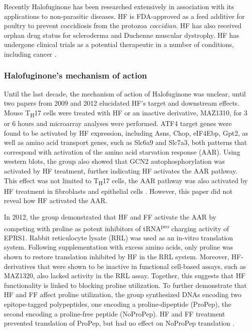 Recently Halofuginone has been researched extensively in association with its applications to non-parasitic diseases.
HF is FDA-approved as a feed additive for poultry to prevent coccidiosis from the protozoa \textit{coccidian}.
HF has also received orphan drug status for scleroderma and Duchenne muscular dystrophy.
HF has undergone clinical trials as a potential therapeutic in a number of conditions, including cancer \cite{halo2012clin, halo2012clin2}.

\subsubsection{Halofuginone's mechanism of action}

Until the last decade, the mechanism of action of Halofuginone was unclear, until two papers from 2009 \cite{sundrud2009halofuginone} and 2012 \cite{keller2012halofuginone} elucidated HF's target and downstream effects.
Mouse T\textsubscript{H}17 cells were treated with HF or an inactive derivative, MAZ1310, for 3 or 6 hours and microarray analyses were performed.
ATF4 target genes were found to be activated by HF expression, including Asns, Chop, eIF4Ebp, Gpt2, as well as amino acid transport genes, such as Slc6a9 and Slc7a3, both patterns that correspond with activation of the amino acid starvation response (AAR).
Using western blots, the group also showed that GCN2 autophosphorylation was activated by HF treatment, further indicating HF activates the AAR pathway.
This effect was not limited to T\textsubscript{H}17 cells, the AAR pathway was also activated by HF treatment in fibroblasts and epithelial cells \cite{sundrud2009halofuginone}.
However, this paper did not reveal how HF activated the AAR.

In 2012, the group demonstrated that HF and FF activate the AAR by competing with proline as potent inhibitors of tRNA\textsuperscript{pro} charging activity of EPRS1.
Rabbit reticulocyte lysate (RRL) was used as an in-vitro translation system.
Following supplementation with excess amino acids, only proline was shown to restore translation inhibited by HF in the RRL system.
Moreover, HF-derivatives that were shown to be inactive in functional cell-based assays, such as MAZ1320, also lacked activity in the RRL assay.
Together, this suggests that HF functionality is linked to blocking proline utilization.
To further demonstrate that HF and FF affect proline utilization, the group synthesized DNAs encoding two epitope-tagged polypeptides, one encoding a proline-dipeptide (ProPep), the second encoding a proline-free peptide (NoProPep).
HF and FF treatment prevented translation of ProPep, but had no effect on NoProPep translation \cite{keller2012halofuginone}.

